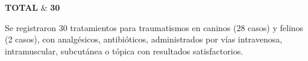 \begin{landscape}
\begin{longtable}
		\textbf{TOTAL} & \textbf{30} \\

	\end{longtable}
	\vspace{-12pt}\normalsize
	Se registraron 30 tratamientos para traumatismos en caninos (28 casos) y felinos (2 casos), con analgésicos, antibióticos, administrados por vías intravenosa, intramuscular, subcutánea o tópica con resultados satisfactorios.

\end{landscape}
